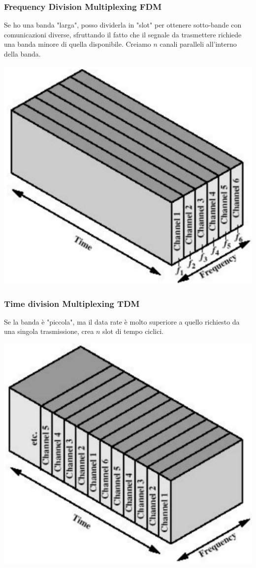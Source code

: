 \subsubsection{Frequency Division Multiplexing FDM}
Se ho una banda "larga", posso dividerla in "slot" per ottenere sotto-bande con comunicazioni diverse, sfruttando il fatto che il segnale da trasmettere richiede una banda minore di quella disponibile. Creiamo $n$ canali paralleli all'interno della banda.\\

\begin{center}
	\includegraphics[width=0.4\linewidth]{img/PTT/fdm1}
\end{center}

\subsubsection{Time division Multiplexing TDM}
Se la banda è "piccola", ma il data rate è molto superiore a quello richiesto da una singola trasmissione, crea $n$ slot di tempo ciclici.\\
\begin{center}
	\includegraphics[width=0.4\linewidth]{img/PTT/tdm1}
\end{center}

\newpage